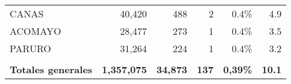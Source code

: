 \begin{tabular}{lrrrrr}
	\cellcolor[HTML]{FFFC9E}CANAS         & 40,420                                                         & 488                                                                  & 2                                                              & 0.4\%                                                                  & 4.9                                                                                                                                \\
	\cellcolor[HTML]{9AFF99}ACOMAYO       & 28,477                                                         & 273                                                                  & 1                                                              & 0.4\%                                                                  & 3.5                                                                                                                                \\
	\cellcolor[HTML]{9AFF99}PARURO        & 31,264                                                         & 224                                                                  & 1                                                              & 0.4\%                                                                  & 3.2                                                                                                                                \\
	&                                                                &                                                                      &                                                                &                                                                        &                                                                                                                                    \\
	\rowcolor[HTML]{ECF4FF} 
	\textbf{Totales generales}            & \textbf{1,357,075}                                             & \textbf{34,873}                                                      & \textbf{137}                                                   & \textbf{0,39\%}                                                        & \textbf{10.1}                                                                                                                     
\end{tabular}